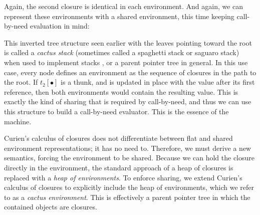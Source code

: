 Again, the second closure is identical in each environment.  And again,
we can represent these environments with a shared environment, this time
keeping call-by-need evaluation in mind:
\begin{center}
\end{center}
This inverted tree structure seen earlier with the leaves pointing toward the
root is called a \emph{cactus stack} (sometimes called a spaghetti stack or
saguaro stack) when used to implement stacks
\cite{hauck1968burroughs,ichbiah1991rationale}, or a parent pointer tree in
general. In this use case, every node defines an environment as the sequence of
closures in the path to the root.  If $t_2[\bullet]$ is a thunk, and is updated
in place with the value after its first reference, then both environments would
contain the resulting value. This is exactly the kind of sharing that is
required by call-by-need, and thus we can use this structure to build a
call-by-need evaluator. This is the essence of the \ce machine. 

Curien's calculus of closures does not differentiate between flat and shared
environment representations; it has no need to. Therefore, we must derive a new
semantics, forcing the environment to be shared. Because we can hold the closure
directly in the environment, the standard approach of a heap of closures is
replaced with a \emph{heap of environments}. To enforce sharing, we extend
Curien's calculus of closures to explicitly include the heap of environments,
which we refer to as a \emph{cactus environment}. This is effectively a parent
pointer tree in which the contained objects are closures. 

